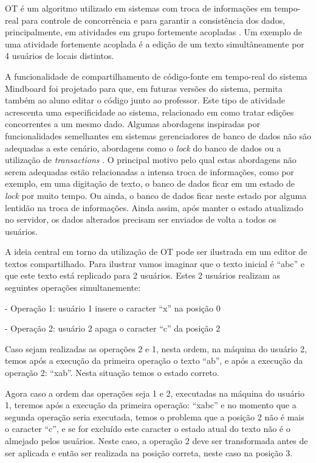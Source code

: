 OT é um algoritmo utilizado em sistemas com troca de informações em tempo-real para controle de concorrência e para garantir a consistência dos dados, principalmente, em atividades em grupo fortemente acopladas \cite{ot}. Um exemplo de uma atividade fortemente acoplada é a edição de um texto simultâneamente por 4 usuários de locais distintos.

A funcionalidade de compartilhamento de código-fonte em tempo-real do sistema Mindboard foi projetado para que, em futuras versões do sistema, permita também ao aluno editar o código junto ao professor. Este tipo de atividade acrescenta uma especificidade ao sistema, relacionado em como tratar edições concorrentes a um mesmo dado. Algumas abordagens inspiradas por funcionalidades semelhantes em sistemas gerenciadores de banco de dados não são adequadas a este cenário, abordagens como o \emph{lock} do banco de dados ou a utilização de \emph{transactions} \cite{ot}. O principal motivo pelo qual estas abordagens não serem adequadas estão relacionadas a intensa troca de informações, como por exemplo, em uma digitação de texto, o banco de dados ficar em um estado de \emph{lock} por muito tempo. Ou ainda, o banco de dados ficar neste estado por alguma lentidão na troca de informações. Ainda assim, após manter o estado atualizado no servidor, os dados alterados precisam ser enviados de volta a todos os usuários. 

A ideia central em torno da utilização de OT pode ser ilustrada em um editor de textos compartilhado. Para ilustrar vamos imaginar que o texto inicial é ``abc'' e que este texto está replicado para 2 usuários. Estes 2 usuários realizam as seguintes operações simultanemente:

- Operação 1: usuário 1 insere o caracter ``x'' na posição 0

- Operação 2: usuário 2 apaga o caracter ``c'' da posição 2

Caso sejam realizadas as operações 2 e 1, nesta ordem, na máquina do usuário 2, temos após a execução da primeira operação o texto ``ab'', e após a execução da operação 2: ``xab''. Nesta situação temos o estado correto.

Agora caso a ordem das operações seja 1 e 2, executadas na máquina do usuário 1, teremos após a execução da primeira operação: ``xabc'' e no momento que a segunda operação seria executada, temos o problema que a posição 2 não é mais o caracter ``c'', e se for excluído este caracter o estado atual do texto não é o almejado pelos usuários. Neste caso, a operação 2 deve ser transformada antes de ser aplicada e então ser realizada na posição correta, neste caso na posição 3. 

